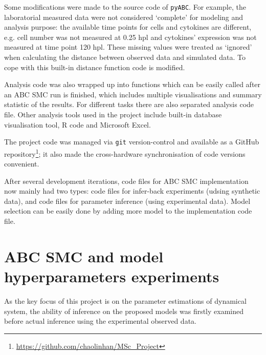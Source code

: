 \documentclass[12pt,a4paper]{report}
\begin{document}
Some modifications were made to the source code of \verb|pyABC|. For example, the laboratorial measured data were not considered `complete' for modeling and analysis purpose: the available time points for cells and cytokines are different, e.g. cell number was not measured at 0.25 hpl and cytokines' expression was not measured at time point 120 hpl. These missing values were treated as `ignored' when calculating the distance between observed data and simulated data. To cope with this built-in distance function code is modified.

Analysis code was also wrapped up into functions which can be easily called after an ABC SMC run is finished, which includes multiple visualisations and summary statistic of the results. For different tasks there are also separated analysis code file. Other analysis tools used in the project include built-in database visualisation tool, R code and Microsoft Excel.

The project code was managed via \verb|git| version-control and available as a GitHub repository\footnote{\url{https://github.com/chaolinhan/MSc_Project}}; it also made the cross-hardware synchronisation of code versions convenient.

After several development iterations, code files for ABC SMC implementation now mainly had two types: code files for infer-back experiments (udsing synthetic data), and code files for parameter inference (using experimental data). Model selection can be easily done by adding more model to the implementation code file.










\section{ABC SMC and model hyperparameters experiments}

As the key focus of this project is on the parameter estimations of dynamical system, the ability of inference on the proposed models was firstly examined before actual inference using the experimental observed data.
\end{document}
